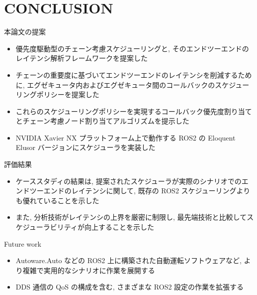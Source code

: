 
\section{CONCLUSION}
\label{sec: conslusion}

\begin{frame}{本論文の提案}
    \begin{itemize}
        \item 優先度駆動型のチェーン考慮スケジューリングと, そのエンドツーエンドのレイテンシ解析フレームワークを提案した
        \item チェーンの重要度に基づいてエンドツーエンドのレイテンシを削減するために, エグゼキュータ内およびエグゼキュータ間のコールバックのスケジューリングポリシーを提案した
        \item これらのスケジューリングポリシーを実現するコールバック優先度割り当てとチェーン考慮ノード割り当てアルゴリズムを提示した
        \item NVIDIA Xavier NX プラットフォーム上で動作する ROS2 の Eloquent Elusor バージョンにスケジューラを実装した
    \end{itemize}
\end{frame}

\begin{frame}{評価結果}
    \begin{itemize}
        \item ケーススタディの結果は, 提案されたスケジューラが実際のシナリオでのエンドツーエンドのレイテンシに関して, 既存の ROS2 スケジューリングよりも優れていることを示した
        \item また, 分析技術がレイテンシの上界を厳密に制限し, 最先端技術と比較してスケジューラビリティが向上することを示した
    \end{itemize}
\end{frame}

\begin{frame}{Future work}
    \begin{itemize}
        \item Autoware.Auto などの ROS2 上に構築された自動運転ソフトウェアなど, より複雑で実用的なシナリオに作業を展開する
        \item DDS 通信の QoS の構成を含む, さまざまな ROS2 設定の作業を拡張する
    \end{itemize}
\end{frame}
